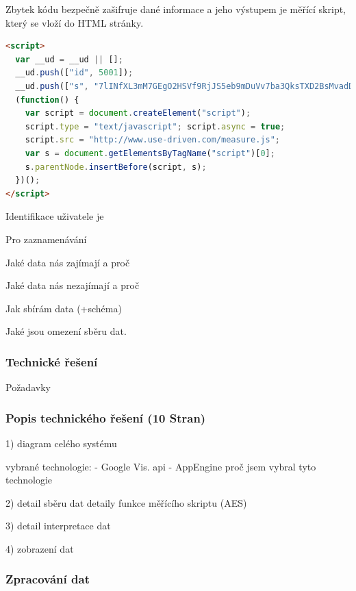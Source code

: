 \documentclass[bc,female,java,dept456]{diploma}						%
\begin{document}
Zbytek kódu bezpečně zašifruje dané informace a jeho výstupem je měřící skript, který se vloží do HTML stránky.

\begin{lstlisting}[label=src:html,caption=Měřící skript,language=HTML]
<script> 
  var __ud = __ud || [];  
  __ud.push(["id", 5001]);
  __ud.push(["s", "7lINfXL3mM7GEgO2HSVf9RjJS5eb9mDuVv7ba3QksTXD2BsMvadDPeU-CoIzid5PDqJI6gCOi0EjmEGtI6XSDbu9at9vY8fw6rwssCDJVA2dfuZYF7kDwzpjzivNOOf AXQls78FzwcjDhc-gxwHohMAa0l9mb7MMlV5JcDDnx7A"]);
  (function() {
    var script = document.createElement("script");
    script.type = "text/javascript"; script.async = true;
    script.src = "http://www.use-driven.com/measure.js";
    var s = document.getElementsByTagName("script")[0]; 
    s.parentNode.insertBefore(script, s);
  })();
</script> 
\end{lstlisting}
\bigskip

Identifikace uživatele je 

Pro zaznamenávání 


Jaké data nás zajímají a proč

Jaké data nás nezajímají a proč

Jak sbírám data (+schéma)

Jaké jsou omezení sběru dat.



\subsubsection{Technické řešení}
\label{sec:technicalities}

Požadavky


\subsubsection{Popis technického řešení (10 Stran)}

1) diagram celého systému

vybrané technologie:
 - Google Vis. api
 - AppEngine
proč jsem vybral tyto technologie


2) detail sběru dat
detaily funkce měřícího skriptu (AES)

3) detail interpretace dat

4) zobrazení dat








\subsubsection{Zpracování dat}
\end{document}
